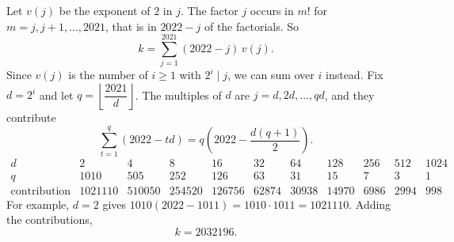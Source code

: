 Let $v(j)$ be the exponent of $2$ in $j$. The factor $j$ occurs in $m!$ for $m=j,j+1,\dots,2021$, that is in $2022-j$ of the factorials. So
\[k=\sum_{j=1}^{2021}(2022-j)\,v(j).\]
Since $v(j)$ is the number of $i\ge1$ with $2^i\mid j$, we can sum over $i$ instead. Fix $d=2^i$ and let $q=\left\lfloor\dfrac{2021}d\right\rfloor$. The multiples of $d$ are $j=d,2d,\dots,qd$, and they contribute
\[\sum_{t=1}^q(2022-td)=q\left(2022-\dfrac{d(q+1)}2\right).\]
\[\begin{array}{c|cccccccccc}
d&2&4&8&16&32&64&128&256&512&1024\\\hline
q&1010&505&252&126&63&31&15&7&3&1\\\hline
\text{contribution}&1021110&510050&254520&126756&62874&30938&14970&6986&2994&998
\end{array}\]
For example, $d=2$ gives $1010(2022-1011)=1010\cdot1011=1021110$. Adding the contributions,
\[k=\boxed{2032196}.\]
